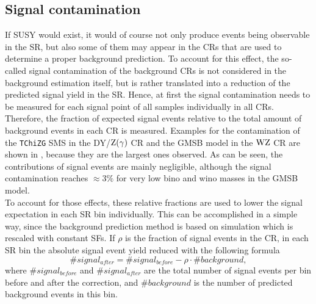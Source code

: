 \subsection{Signal contamination}\label{sec:signalCont}
If SUSY would exist, it would of course not only produce events being observable in the SR, but also some of them may appear in the CRs that are used to determine a proper background prediction. To account for this effect, the so-called signal contamination of the background CRs is not considered in the background estimation itself, but is rather translated into a reduction of the predicted signal yield in the SR. Hence, at first the signal contamination needs to be measured for each signal point of all samples individually in all CRs.\\
Therefore, the fraction of expected signal events relative to the total amount of background events in each CR is measured. Examples for the contamination of the \texttt{TChiZG} SMS in the DY/$\mathrm{Z}(\gamma)$ CR and the GMSB model in the $\mathrm{W}\mathrm{Z}$ CR are shown in , because they are the largest ones observed. As can be seen, the contributions of signal events are mainly negligible, although the signal contamination reaches $\approx 3\%$ for very low bino and wino masses in the GMSB model.\\
To account for those effects, these relative fractions are used to lower the signal expectation in each SR bin individually. This can be accomplished in a simple way, since the background prediction method is based on simulation which is rescaled with constant SFs. If $\rho$ is the fraction of signal events in the CR, in each SR bin the absolute signal event yield reduced with the following formula
\begin{equation}
 \#signal_{after} = \#signal_{before} - \rho\cdot\#background,
\end{equation}
where $\#signal_{before}$ and $\#signal_{after}$ are the total number of signal events per bin before and after the correction, and $\#background$ is the number of predicted background events in this bin.

